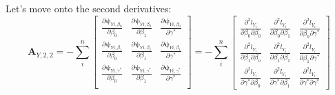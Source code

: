 \documentclass[]{article}
\begin{document}
Let's move onto the second derivatives:
  \[
  \pmb{A}_{Y,2,2} = -\sum_i^n\begin{bmatrix}
      \frac{\partial \pmb{\psi}_{Yi,\beta_0}}{ \partial \beta_0} &
      \frac{\partial \pmb{\psi}_{Yi,\beta_0}}{ \partial \beta_1} &
      \frac{\partial \pmb{\psi}_{Yi,\beta_0}}{ \partial \gamma^*} \\
      \frac{\partial \pmb{\psi}_{Yi,\beta_1}}{ \partial \beta_0} &
      \frac{\partial \pmb{\psi}_{Yi,\beta_1}}{ \partial \beta_1} &
      \frac{\partial \pmb{\psi}_{Yi,\beta_1}}{ \partial \gamma^*} \\
      \frac{\partial \pmb{\psi}_{Yi,\gamma^*}}{ \partial \beta_0} &
      \frac{\partial \pmb{\psi}_{Yi,\gamma^*}}{ \partial \beta_1} &
      \frac{\partial \pmb{\psi}_{Yi,\gamma^*}}{ \partial \gamma^*}\\
  \end{bmatrix}
   =-\sum_i^n\begin{bmatrix}
      \frac{\partial^2 l_{Y_i}}{ \partial \beta_0\partial \beta_0}  & \frac{\partial^2 l_{Y_i}}{ \partial \beta_0\partial \beta_1} & \frac{\partial^2 l_{Y_i}}{ \partial \beta_0\partial \gamma^*} \\
      \frac{\partial^2 l_{Y_i}}{ \partial \beta_1\partial \beta_o}  & \frac{\partial^2 l_{Y_i}}{ \partial \beta_1\partial \beta_1} & \frac{\partial^2 l_{Y_i}}{ \partial \beta_1\partial \gamma^*}\\
      \frac{\partial^2 l_{Y_i}}{ \partial \gamma^*\partial \beta_0}  & \frac{\partial^2 l_{Y_i}}{ \partial \gamma^*\partial \beta_1} & \frac{\partial^2 l_{Y_i}}{ \partial \gamma^*\partial \gamma^*}
  \end{bmatrix}
  \]
  
\end{document}
